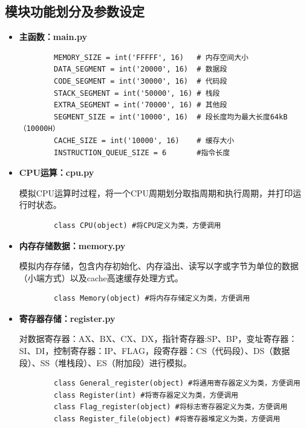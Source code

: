 \documentclass[UTF8,12pt]{article}
\begin{document}
	
	\subsection{模块功能划分及参数设定}
	
	\begin{itemize}
		\item \textbf{主函数：main.py}
		
		\begin{lstlisting}		
		MEMORY_SIZE = int('FFFFF', 16)   # 内存空间大小
		DATA_SEGMENT = int('20000', 16)  # 数据段
		CODE_SEGMENT = int('30000', 16)  # 代码段
		STACK_SEGMENT = int('50000', 16) # 栈段
		EXTRA_SEGMENT = int('70000', 16) # 其他段
		SEGMENT_SIZE = int('10000', 16)  # 段长度均为最大长度64kB（10000H）
		CACHE_SIZE = int('10000', 16)    # 缓存大小
		INSTRUCTION_QUEUE_SIZE = 6     	 #指令长度
		\end{lstlisting}
		
		\item \textbf{CPU运算：cpu.py}
		
		模拟CPU运算时过程，将一个CPU周期划分取指周期和执行周期，并打印运行时状态。
		
		\begin{lstlisting}
		class CPU(object) #将CPU定义为类，方便调用
		\end{lstlisting}
		
		\item \textbf{内存存储数据：memory.py}
		
		模拟内存存储，包含内存初始化、内存溢出、读写以字或字节为单位的数据（小端方式）以及cache高速缓存处理方式。
		
		\begin{lstlisting}
		class Memory(object) #将内存存储定义为类，方便调用		
		\end{lstlisting}
		
		\item \textbf{寄存器存储：register.py}
		
		对数据寄存器：AX、BX、CX、DX，指针寄存器:SP、BP，变址寄存器：SI、DI，控制寄存器：IP、FLAG，段寄存器：CS（代码段）、DS（数据段）、SS（堆栈段）、ES（附加段）进行模拟。
		
		\begin{lstlisting}
		class General_register(object) #将通用寄存器定义为类，方便调用
		class Register(int) #将寄存器定义为类，方便调用
		class Flag_register(object) #将标志寄存器定义为类，方便调用
		class Register_file(object) #将寄存器堆定义为类，方便调用
		\end{lstlisting}
		

\end{itemize}
\end{document}
